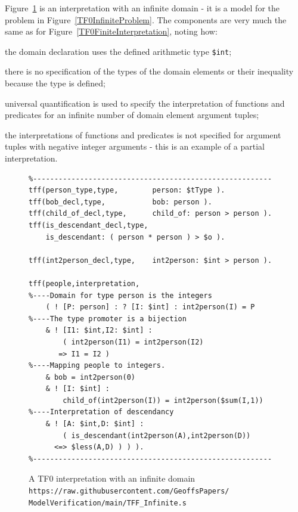 \documentclass[letterpaper]{article}
\newcommand{\smalltt}[1]{\small \texttt{#1}}
\newenvironment{packed_itemize}{
\vspace*{-0.5em}
\begin{itemize}
\setlength{\partopsep}{0pt}
\setlength{\itemsep}{1pt}
\setlength{\parskip}{0pt}
\setlength{\parsep}{0pt}
}{\end{itemize}}
\begin{document}
Figure~\ref{TF0InfiniteInterpretation} is an interpretation with an infinite domain - it is a model 
for the problem in Figure~\ref{TF0InfiniteProblem}.
The components are very much the same as for Figure~\ref{TF0FiniteInterpretation}, noting how:
\begin{packed_itemize}
\item the domain declaration uses the defined arithmetic type \smalltt{\$int};
\item there is no specification of the types of the domain elements or their inequality because 
      the type is defined;
\item universal quantification is used to specify the interpretation of functions and predicates
      for an infinite number of domain element argument tuples;
\item the interpretations of functions and predicates is not specified for argument tuples with 
      negative integer arguments - this is an example of a partial interpretation.
\end{packed_itemize}

\begin{figure}[htbp]
\scriptsize
{}
\begin{verbatim}
%--------------------------------------------------------
tff(person_type,type,        person: $tType ).
tff(bob_decl,type,           bob: person ).
tff(child_of_decl,type,      child_of: person > person ).
tff(is_descendant_decl,type, 
    is_descendant: ( person * person ) > $o ).

tff(int2person_decl,type,    int2person: $int > person ).

tff(people,interpretation,
%----Domain for type person is the integers
    ( ! [P: person] : ? [I: $int] : int2person(I) = P
%----The type promoter is a bijection
    & ! [I1: $int,I2: $int] : 
        ( int2person(I1) = int2person(I2) 
       => I1 = I2 )
%----Mapping people to integers. 
    & bob = int2person(0)
    & ! [I: $int] : 
        child_of(int2person(I)) = int2person($sum(I,1))
%----Interpretation of descendancy
    & ! [A: $int,D: $int] : 
        ( is_descendant(int2person(A),int2person(D)) 
      <=> $less(A,D) ) ) ).
%--------------------------------------------------------
\end{verbatim}
\caption{A TF0 interpretation with an infinite domain\\
{\scriptsize {\tt https://raw.githubusercontent.com/GeoffsPapers/\\
ModelVerification/main/TFF\_Infinite.s}}}
\label{TF0InfiniteInterpretation}
\end{figure}
\end{document}
